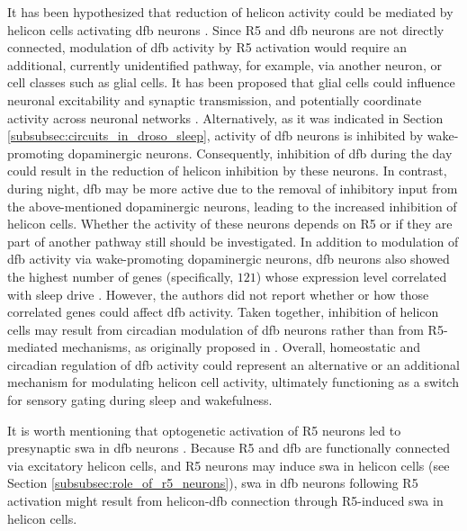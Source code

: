 \documentclass[../main.tex]{subfiles}
\begin{document}
It has been hypothesized that reduction of helicon activity could be mediated by helicon cells activating \gls{dfb} neurons \parencite{raccugliaCoherentMultilevelNetwork2022}.
Since R5 and \gls{dfb} neurons are not directly connected, modulation of \gls{dfb} activity by R5 activation would require an additional, currently unidentified pathway, for example, via another neuron, or cell classes such as glial cells.
It has been proposed that glial cells could influence neuronal excitability and synaptic transmission, and potentially coordinate activity across neuronal networks \parencite{fieldsNewInsightsNeuronglia2002}.
Alternatively, as it was indicated in Section \ref{subsubsec:circuits_in_droso_sleep}, activity of \gls{dfb} neurons is inhibited by wake-promoting dopaminergic neurons.
Consequently, inhibition of \gls{dfb} during the day could result in the reduction of helicon inhibition by these neurons. In contrast, during night, \gls{dfb} may be more active due to the removal of inhibitory input from the above-mentioned dopaminergic neurons, leading to the increased inhibition of helicon cells.
Whether the activity of these neurons depends on R5 or if they are part of another pathway still should be investigated. In addition to modulation of \gls{dfb} activity via wake-promoting dopaminergic neurons, \gls{dfb} neurons also showed the highest number of genes (specifically, $121$) whose expression level correlated with sleep drive \parencite{doppSinglecellTranscriptomicsReveals2024}. However, the authors did not report whether or how those correlated genes could affect \gls{dfb} activity. 
Taken together, inhibition of helicon cells may result from circadian modulation of \gls{dfb} neurons rather than from R5-mediated mechanisms, as originally proposed in \parencite{raccugliaCoherentMultilevelNetwork2022}. Overall, homeostatic and circadian regulation of \gls{dfb} activity could represent an alternative or an additional mechanism for modulating helicon cell activity, ultimately functioning as a switch for sensory gating during sleep and wakefulness.

It is worth mentioning that optogenetic activation of R5 neurons led to presynaptic \gls{swa} in \gls{dfb} neurons \parencite{raccugliaCoherentMultilevelNetwork2022}.
Because R5 and \gls{dfb} are functionally connected via excitatory helicon cells, and R5 neurons may induce \gls{swa} in helicon cells (see Section \ref{subsubsec:role_of_r5_neurons}), \gls{swa} in \gls{dfb} neurons following R5 activation might result from helicon-\gls{dfb} connection through R5-induced \gls{swa} in helicon cells.
\end{document}
